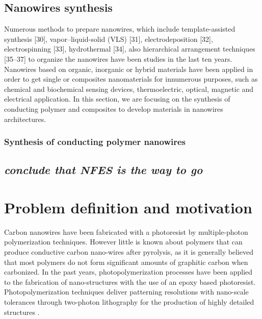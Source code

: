 \subsection{Nanowires synthesis}

Numerous methods to prepare nanowires, which include template-assisted synthesis [30], vapor–liquid-solid (VLS) [31], electrodeposition [32], electrospinning [33], hydrothermal [34], also hierarchical arrangement techniques [35–37] to organize the nanowires have been studies in the last ten years. Nanowires based on organic, inorganic or hybrid materials have been applied in order to get single or composites nanomaterials for innumerous purposes, such as chemical and biochemical sensing devices, thermoelectric, optical, magnetic and electrical application. In this section, we are focusing on the synthesis of conducting polymer and composites to develop materials in nanowires architectures.

\subsubsection{Synthesis of conducting polymer nanowires}



\subsection{\emph{conclude that NFES is the way to go}}




\section{Problem definition and motivation}


Carbon nanowires have been fabricated with a photoresist by multiple-photon polymerization techniques. However little is known about polymers that can produce conductive carbon nano-wires after pyrolysis, as it is generally believed that most polymers do not form significant amounts of graphitic carbon when carbonized.
In the past years, photopolymerization processes have been applied to the fabrication of nano-structures with the use of an epoxy based photoresist. \cite{Boer2014} Photopolymerization techniques deliver patterning resolutions with nano-scale tolerances through two-photon lithography for the production of highly detailed structures \cite{Hribar2014}.

